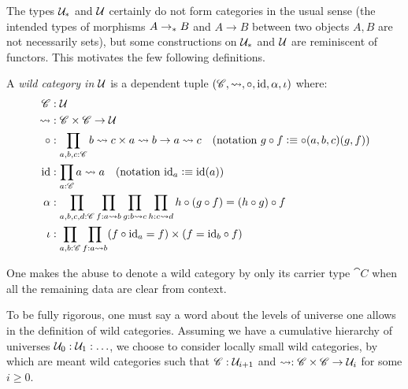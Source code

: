 \documentclass[english,a4paper]{lmcs}
\begin{document}

\label{sec:wild-functors}
\def\hom(#1,#2){#1 \rightsquigarrow #2}
%
The types $\mathcal{U}_*$ and $\mathcal{U}$ certainly do not form categories in the usual
sense (the intended types of morphisms $A \to_\ast B$ and $A\to B$ between two
objects $A,B$ are not necessarily sets), but some constructions on $\mathcal{U}_*$ and $\mathcal{U}$ are
reminiscent of functors. This motivates the few following definitions.

\begin{defi}
  A \emph{wild category in} $\mathcal{U}$ is a dependent tuple $(\cat C, \hom( , ), \circ, \id, \alpha,
  \iota)$ where:
  \begin{align*}
    \cat C&: \UU \\
    \hom( , )&: \cat C \times \cat C \to \UU \\
    \circ&: \prod_{a,b,c:\cat C} \hom(b,c) \times \hom(a,b) \to \hom(a,c)
    \quad (\text{notation}\ g\circ f \defequi \circ(a,b,c)(g,f)) \\
    \id&: \prod_{a:\cat C} \hom(a,a) \quad (\text{notation}\ \id_a \defequi \id(a)) \\
    \alpha&: \prod_{a,b,c,d:\cat C} \prod_{f:\hom(a,b)} \prod_{g:\hom(b,c)} \prod_{h:\hom(c,d)}
    h\circ (g \circ f) = (h \circ g) \circ f \\
    \iota&: \prod_{a,b:\cat C} \prod_{f:\hom(a,b)} (f\circ \id_a = f) \times (f = \id_b \circ f)
  \end{align*}
  \label{defn:wild-cat}
\end{defi}
One makes the abuse to denote a wild category by only its carrier type $\cat C$ when
all the remaining data are clear from context.

\begin{rem}
  To be fully rigorous, one must say a word about the levels of universe one
  allows in the definition of wild categories. Assuming we have a cumulative
  hierarchy of universes $\mathcal{U}_0 : \mathcal{U}_1 : \ldots$, we choose to consider
  locally small wild categories, by which are meant wild categories such that
  $\mathscr{C}:\mathcal{U}_{i+1}$ and $\hom(,): \cat C \times \cat C \to \UU_i$ for some
  $i\geq 0$.
  \label{rem:universes-locally-small-cats}
\end{rem}
\end{document}
